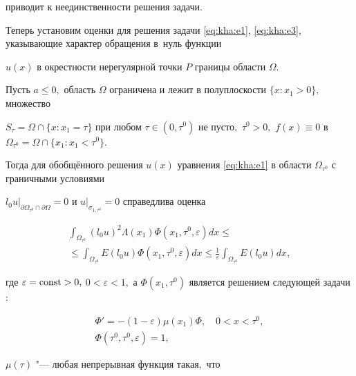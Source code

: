 приводит к неединственности решения задачи.



Теперь установим оценки для решения задачи \eqref{eq:kha:e1}, \eqref{eq:kha:e3}, указывающие характер обращения в~нуль функции

$u(x)$ в окрестности нерегулярной точки $P$ границы области $\Omega.$



\smallskip



\begin{theorem}[3]Пусть $a\leq0,$ область  $\Omega$ ограничена и лежит в полуплоскости $\{x:x_1>0\},$ множество 

$S_\tau=\Omega\cap\{x:x_1=\tau\}$ при любом $\tau\in(0, \tau^0)$ не пусто$,$ $\tau^0>0,$ $f(x)\equiv0$ в $\Omega_{\tau^0}=\Omega\cap\{x_1:x_1<\tau^0\}.$ 

Тогда для обобщённого решения  $u(x)$ уравнения \eqref{eq:kha:e1} в области $\Omega_{\tau^0}$ с граничными условиями

$l_0u\big|_{\partial\Omega_{\tau^0}\cap\partial\Omega}=0$ и $u\big|_{\sigma_{1,\tau^0}}=0$   справедлива оценка

\begin{multline}\label{eq:kha:e17}

\int _{\Omega_{\tau^0}}(l_0u)^2\Lambda(x_1)\Phi(x_1,\tau^0,\varepsilon) dx \leq \\ \leq \int _{\Omega_{\tau^0}}E(l_0u)\Phi(x_1,\tau^0,\varepsilon)dx\leq \frac{1}{\varepsilon}\int _{\Omega_{\tau^0}}E(l_0u)dx,

\end{multline}

где $\varepsilon={\rm const}>0,$  $0<\varepsilon<1,$ а $\Phi(x_1,\tau^0)$ является решением следующей задачи\/$:$

\begin{gather}

\label{eq:kha:e18}

\Phi'=-(1-\varepsilon)\mu(x_1)\Phi,\quad 0< x< \tau^0,

\\

\label{eq:kha:e19}

\Phi(\tau^0,\tau^0,\varepsilon)=1,

\end{gather}

$\mu(\tau)$ "--- любая непрерывная функция такая$,$ что

\begin{equation}\label{eq:kha:e20}


\end{equation}
\end{theorem}

